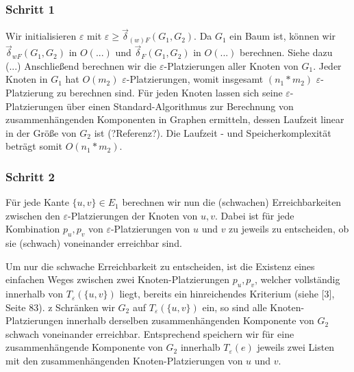 \documentclass[a4paper, 12pt, twoside]{article}
\theoremstyle{Format1} %
\begin{document}
\subsubsection{Schritt 1} \label{Schritt 1}
Wir initialisieren $\varepsilon$ mit $\varepsilon \geq \vec{\delta}_{(w)F}(G_1, G_2)$.
Da $G_1$ ein Baum ist, können wir
$\vec{\delta}_{wF}(G_1, G_2)$ in $O(...)$ und $\vec{\delta}_F(G_1, G_2)$ in $O(...)$ berechnen. Siehe dazu (...)
Anschließend berechnen wir die $\varepsilon$-Platzierungen aller Knoten von $G_1$. Jeder Knoten in $G_1$ hat $O(m_2)$
$\varepsilon$-Platzierungen, womit insgesamt $(n_1*m_2)$ $\varepsilon$-Platzierung zu berechnen sind.
Für jeden Knoten lassen sich seine $\varepsilon$-Platzierungen über einen Standard-Algorithmus zur Berechnung von
zusammenhängenden Komponenten in Graphen ermitteln, dessen Laufzeit linear in der Größe von $G_2$ ist (?Referenz?).
Die Laufzeit - und Speicherkomplexität beträgt somit $O(n_1*m_2)$.

\subsubsection{Schritt 2} \label{Schritt 2}
Für jede Kante $\{u, v\} \in E_1$ berechnen wir nun die (schwachen) Erreichbarkeiten zwischen den $\varepsilon$-Platzierungen der Knoten von $u,v$.
Dabei ist für jede Kombination $p_u, p_v$ von $\varepsilon$-Platzierungen von $u$ und $v$ zu jeweils zu entscheiden, ob sie (schwach) voneinander erreichbar sind.

Um nur die schwache Erreichbarkeit zu entscheiden, ist die Existenz eines einfachen Weges zwischen zwei Knoten-Platzierungen
$p_u,p_v$, welcher vollständig innerhalb von $T_{\varepsilon}(\{u,v\})$ liegt, bereits ein hinreichendes Kriterium (siehe [3], Seite 83).
z
Schränken wir $G_2$ auf $T_{\varepsilon}(\{u,v\})$ ein, so sind alle Knoten-Platzierungen innerhalb derselben zusammenhängenden Komponente von $G_2$
schwach voneinander erreichbar. Entsprechend speichern wir für eine zusammenhängende Komponente von $G_2$ innerhalb $T_{\varepsilon}(e)$ jeweils zwei Listen mit den
zusammenhängenden Knoten-Platzierungen von $u$ und $v$.
\end{document}
